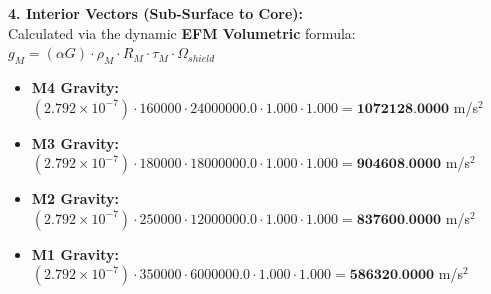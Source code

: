 \documentclass[11pt, a4paper]{article}
\begin{document}
  \vspace{0.5em}
  \noindent \textbf{4. Interior Vectors (Sub-Surface to Core):} \\[0.5em]
  \hspace*{1em} Calculated via the dynamic \textbf{EFM Volumetric} formula: $g_M = (\alpha G) \cdot \rho_{M} \cdot R_M \cdot \tau_M \cdot \Omega_{shield}$
  \begin{itemize}
    \item \textbf{M4 Gravity:} $(2.792 \times 10^{-7}) \cdot 160000 \cdot 24000000.0 \cdot 1.000 \cdot 1.000 = \textbf{1072128.0000}$ m/s$^2$
    \item \textbf{M3 Gravity:} $(2.792 \times 10^{-7}) \cdot 180000 \cdot 18000000.0 \cdot 1.000 \cdot 1.000 = \textbf{904608.0000}$ m/s$^2$
    \item \textbf{M2 Gravity:} $(2.792 \times 10^{-7}) \cdot 250000 \cdot 12000000.0 \cdot 1.000 \cdot 1.000 = \textbf{837600.0000}$ m/s$^2$
    \item \textbf{M1 Gravity:} $(2.792 \times 10^{-7}) \cdot 350000 \cdot 6000000.0 \cdot 1.000 \cdot 1.000 = \textbf{586320.0000}$ m/s$^2$
  \end{itemize}
\end{document}
